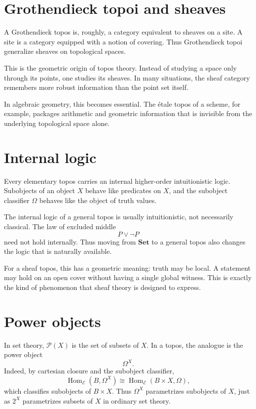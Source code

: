 \section{Grothendieck topoi and sheaves}

A Grothendieck topos is, roughly, a category equivalent to sheaves on a site.  A site is a category equipped with a notion of covering.  Thus Grothendieck topoi generalize sheaves on topological spaces.

\begin{remark}
This is the geometric origin of topos theory.  Instead of studying a space only through its points, one studies its sheaves.  In many situations, the sheaf category remembers more robust information than the point set itself.
\end{remark}

In algebraic geometry, this becomes essential.  The étale topos of a scheme, for example, packages arithmetic and geometric information that is invisible from the underlying topological space alone.

\section{Internal logic}

Every elementary topos carries an internal higher-order intuitionistic logic.  Subobjects of an object \(X\) behave like predicates on \(X\), and the subobject classifier \(\Omega\) behaves like the object of truth values.

\begin{remark}
The internal logic of a general topos is usually intuitionistic, not necessarily classical.  The law of excluded middle
\[
  P\vee\neg P
\]
need not hold internally.  Thus moving from \(\mathbf{Set}\) to a general topos also changes the logic that is naturally available.
\end{remark}

For a sheaf topos, this has a geometric meaning: truth may be local.  A statement may hold on an open cover without having a single global witness.  This is exactly the kind of phenomenon that sheaf theory is designed to express.

\section{Power objects}

In set theory, \(\mathcal P(X)\) is the set of subsets of \(X\).  In a topos, the analogue is the power object
\[
  \Omega^X.
\]
Indeed, by cartesian closure and the subobject classifier,
\[
  \operatorname{Hom}_{\mathcal E}(B,\Omega^X)
  \cong
  \operatorname{Hom}_{\mathcal E}(B\times X,\Omega),
\]
which classifies subobjects of \(B\times X\).  Thus \(\Omega^X\) parametrizes subobjects of \(X\), just as \(2^X\) parametrizes subsets of \(X\) in ordinary set theory.

